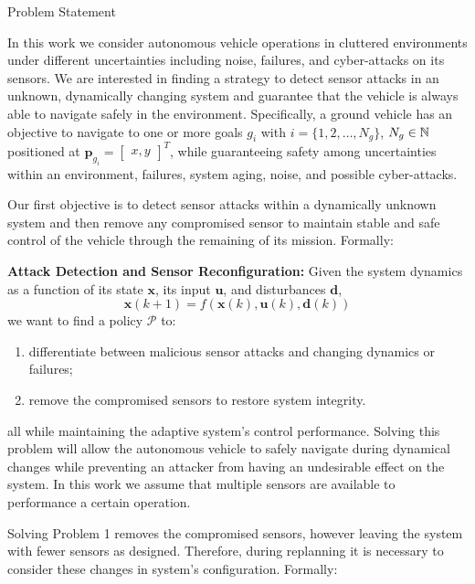 \begin{section}{Problem Statement}
	
\label{sec:problem}

In this work we consider autonomous vehicle operations in cluttered environments under different uncertainties including noise, failures, and cyber-attacks on its sensors. 
We are interested in finding a strategy to detect sensor attacks in an unknown, dynamically changing system and guarantee that the vehicle is always able to navigate safely in the environment. Specifically, a ground vehicle has an objective to navigate to one or more goals $g_i$ with $ i = \{1, 2, \dots, N_g\}$, $N_g \in \mathbb{N}$ positioned at $\bm{p}_{g_i}={\begin{bmatrix} x,y \end{bmatrix}}^T$, while guaranteeing safety among uncertainties within an environment, failures, system aging, noise, and possible cyber-attacks.





Our first objective is to detect sensor attacks within a dynamically unknown system and then remove any compromised sensor to maintain stable and safe control of the vehicle through the remaining of its mission. Formally:

\begin{problem} 
\label{problem1} {\textbf{Attack Detection and Sensor Reconfiguration:}} 
 Given the system dynamics as a function of its state $ \bm{x} $, its input $ \bm{u}$, and disturbances $ \bm{d} $,
	\begin{equation}
		\bm{x}(k+1) = f(\bm{x}(k), \bm{u}(k), \bm{d}(k))
	\end{equation}
we want to find a policy $\mathcal{P}$ to:
\begin{enumerate}
	\item differentiate between malicious sensor attacks and changing dynamics or failures; 
	\item remove the compromised sensors to restore system integrity. %
\end{enumerate}
all while maintaining the adaptive system's control performance. Solving this problem will allow the autonomous vehicle to safely navigate during dynamical changes while preventing an attacker from having an undesirable effect on the system. In this work we assume that multiple sensors are available to performance a certain operation. 
\end{problem}
Solving Problem 1 removes the compromised sensors, however leaving the system with fewer sensors as designed. Therefore, during replanning it is necessary to consider these changes in system's configuration. Formally:
	

\end{section}
